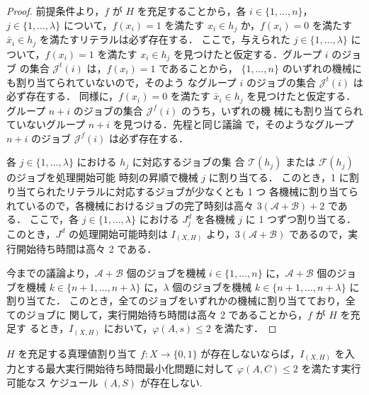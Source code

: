 \documentclass[12pt]{optlab-bachelor}
\begin{document}
\begin{proof}
  前提条件より，$f$ が $H$ を充足することから，各 $i \in \{1,\ldots,n\}$，
  $j \in \{1, \ldots, \lambda \}$ について，$f(x_i) = 1$ を満たす $x_i
  \in h_j$ か，$f(x_i) = 0$ を満たす $\bar x_i \in h_j$ を満たすリテラルは必ず存在する．
  ここで，与えられた $j \in \{1, \ldots, \lambda \}$ について，$f(x_i) =
  1$ を満たす $x_i \in h_j$ を見つけたと仮定する．グループ $i$ のジョブ
  の集合 $\mathcal{J}^t(i)$ は，$f(x_i) = 1$ であることから，
  $\{1,\ldots,n\}$ のいずれの機械にも割り当てられていないので，そのよう
  なグループ $i$ のジョブの集合 $\mathcal{J}^t(i)$ は必ず存在する．
  同様に，$f(x_i) = 0$ を満たす $\bar x_i \in h_j$ を見つけたと仮定する．
  グループ $n + i$ のジョブの集合 $\mathcal{J}^f(i)$ のうち，いずれの機
  械にも割り当てられていないグループ $n + i$ を見つける．先程と同じ議論
  で，そのようなグループ $n + i$ のジョブ $\mathcal{J}^f(i)$ は必ず存在する．

  各 $j \in \{1, \ldots, \lambda \}$ における $h_j$ に対応するジョブの集
  合 $\mathcal{T}(h_j)$ または $\mathcal{F}(h_j)$ のジョブを処理開始可能
  時刻の昇順で機械 $j$ に割り当てる．
  このとき，1 に割り当てられたリテラルに対応するジョブが少なくとも 1 つ
  各機械に割り当てられているので，各機械におけるジョブの完了時刻は高々
  $3(\mathcal{A} + \mathcal{B}) + 2$ である．
  ここで，各 $j \in \{1,\ldots,\lambda\}$ における $J^d_j$ を各機械 $j$
  に 1 つずつ割り当てる．
  このとき，$J^d$ の処理開始可能時刻は $I_{(X,H)}$ より，$3(\mathcal{A}
  + \mathcal{B})$ であるので，実行開始待ち時間は高々 2 である．

  今までの議論より，$\mathcal{A} + \mathcal{B}$ 個のジョブを機械 $i \in
  \{1,\ldots,n\}$ に，$\mathcal{A} + \mathcal{B}$ 個のジョブを機械 $k \in\{n + 1, \ldots, n + \lambda\}$ に，$\lambda$ 個のジョブを機械 $k \in\{n + 1, \ldots, n + \lambda\}$ に割り当てた．
  このとき，全てのジョブをいずれかの機械に割り当てており，全てのジョブに
  関して，実行開始待ち時間は高々 2 であることから，$f$ が $H$ を充足す
  るとき，$I_{(X,H)}$ において，$\varphi(A,s) \le 2$ を満たす．
\end{proof}

\begin{lemma}\label{l_6}
  $H$ を充足する真理値割り当て $f : X \to \{0,1\}$ が存在しないならば，$I_{(X,H)}$ を入力とする最大実行開始待ち時間最小化問題に対して
  $\varphi(A, C) \le 2$ を満たす実行可能なス
  ケジュール $(A, S)$ が存在しない.
\end{lemma}
\end{document}

